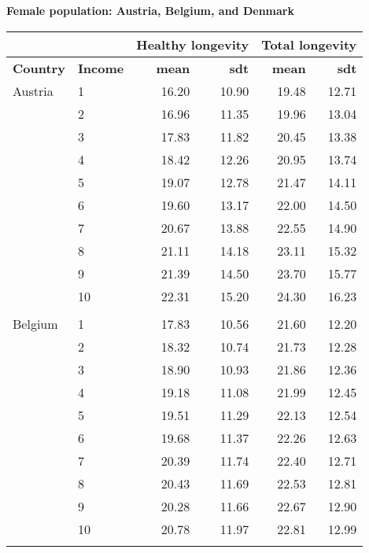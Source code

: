 \begin{table}
\centering \textbf{Female population: Austria, Belgium, and Denmark}\par\medskip\medskip
\begin{tabular}{llrrrr}
\toprule
& & \multicolumn{2}{l}{Healthy longevity} & \multicolumn{2}{l}{Total longevity} \\
\midrule
\textbf{Country }& \textbf{Income} &  \textbf{mean}       &  \textbf{sdt}     &     \textbf{mean}         & \textbf{sdt}    \\
\midrule
Austria & 1  &   16.20 &  10.90 &  19.48 &  12.71 \\
            & 2  &   16.96 &  11.35 &  19.96 &  13.04 \\
            & 3  &   17.83 &  11.82 &  20.45 &  13.38 \\
            & 4  &   18.42 &  12.26 &  20.95 &  13.74 \\
            & 5  &   19.07 &  12.78 &  21.47 &  14.11 \\
            & 6  &   19.60 &  13.17 &  22.00 &  14.50 \\
            & 7  &   20.67 &  13.88 &  22.55 &  14.90 \\
            & 8  &   21.11 &  14.18 &  23.11 &  15.32 \\
            & 9  &   21.39 &  14.50 &  23.70 &  15.77 \\
            & 10 &   22.31 &  15.20 &  24.30 &  16.23 \\
                      & &    &   &   &  \\
Belgium & 1  &   17.83 &  10.56 &  21.60 &  12.20 \\
            & 2  &   18.32 &  10.74 &  21.73 &  12.28 \\
            & 3  &   18.90 &  10.93 &  21.86 &  12.36 \\
            & 4  &   19.18 &  11.08 &  21.99 &  12.45 \\
            & 5  &   19.51 &  11.29 &  22.13 &  12.54 \\
            & 6  &   19.68 &  11.37 &  22.26 &  12.63 \\
            & 7  &   20.39 &  11.74 &  22.40 &  12.71 \\
            & 8  &   20.43 &  11.69 &  22.53 &  12.81 \\
            & 9  &   20.28 &  11.66 &  22.67 &  12.90 \\
            & 10 &   20.78 &  11.97 &  22.81 &  12.99 \\
                      & &    &   &   &  \\

\end{tabular}
\end{table}

